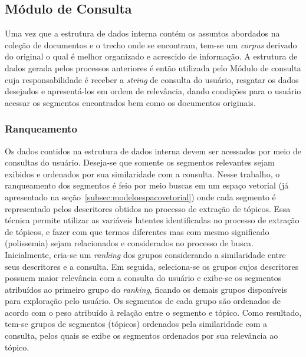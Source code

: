 
\subsection{Módulo de Consulta}


Uma vez que a estrutura de dados interna contém os assuntos abordados na coleção de documentos e o trecho onde se encontram, tem-se um \textit{corpus} derivado do original o qual é melhor organizado e acrescido de informação. A estrutura de dados gerada pelos processos anteriores é então utilizada pelo Módulo de consulta cuja responsabilidade é receber a \textit{string} de consulta do usuário, resgatar os dados desejados e apresentá-los em ordem de relevância, dando condições para o usuário acessar os segmentos encontrados bem como os documentos originais.

\subsubsection{Ranqueamento}

Os dados contidos na estrutura de dados interna devem ser acessados por meio de consultas do usuário. Deseja-se que somente os segmentos relevantes sejam exibidos e ordenados por sua similaridade com a consulta. 
Nesse trabalho, o ranqueamento dos segmentos é feio por meio buscas em um espaço vetorial (já apresentado na seção~\ref{subsec:modeloespacovetorial}) onde cada segmento é representado pelos descritores obtidos no processo de extração de tópicos. Essa técnica permite utilizar as variáveis latentes identificadas no processo de extração de tópicos, e fazer com que termos diferentes mas com mesmo significado (polissemia) sejam relacionados e considerados no processo de busca.
Inicialmente, cria-se um \textit{ranking} dos grupos considerando a similaridade entre seus descritores e a consulta. Em seguida, seleciona-se os grupos cujos descritores possuem maior relevância com a consulta do usuário e exibe-se os segmentos atribuídos ao primeiro grupo do \textit{ranking}, ficando os demais grupos disponíveis para exploração pelo usuário. 
Os segmentos de cada grupo são ordenados de acordo com o peso atribuído à relação entre o segmento e tópico.  Como resultado, tem-se grupos de segmentos (tópicos) ordenados pela similaridade com a consulta, pelos quais se exibe os segmentos ordenados por sua relevância ao tópico. 






